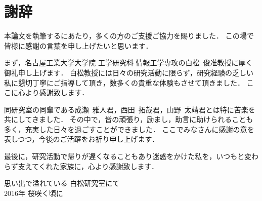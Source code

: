 \chapter*{謝辞}
本論文を執筆するにあたり，多くの方のご支援ご協力を賜りました．
この場で皆様に感謝の言葉を申し上げたいと思います．

まず，名古屋工業大学大学院 工学研究科 情報工学専攻の白松~俊准教授に厚く御礼申し上げます．
白松教授には日々の研究活動に限らず，研究経験の乏しい私に懇切丁寧にご指導して頂き，数多くの貴重な体験もさせて頂きました．
ここに心より感謝致します．

同研究室の同輩である成瀬~雅人君，西田~拓哉君，山野~太靖君とは特に苦楽を共にしてきました．
その中で，皆の頑張り，励まし，助言に助けられることも多く，充実した日々を過ごすことができました．
ここでみなさんに感謝の意を表しつつ，今後のご活躍をお祈り申し上げます．

最後に，研究活動で帰りが遅くなることもあり迷惑をかけた私を，いつもと変わらず支えてくれた家族に，心より感謝致します．

\vspace*{4.5mm}

\begin{flushright}
思い出で溢れている 白松研究室にて \\
2016年 桜咲く頃に \\
\vspace*{1.8mm}
\end{flushright}
